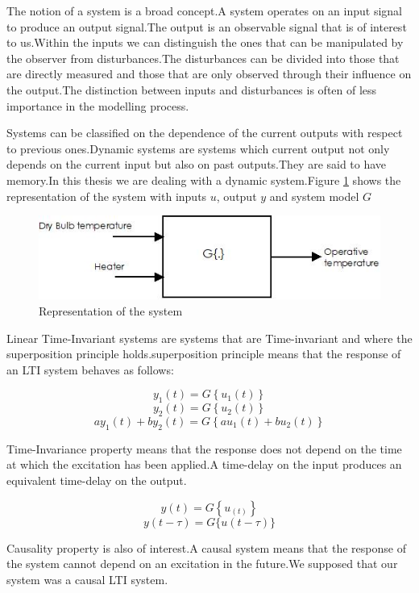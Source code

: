 \documentclass[a4paper,12pt]{article}
\numberwithin{equation}{section}
\begin{document}
The notion of a system is a broad concept.A system operates on an input signal to produce an output signal.The output is an observable signal that is of interest to us.Within the inputs we can distinguish the ones that can be manipulated by the observer from disturbances.The disturbances can be divided into those that are directly measured and those that are only observed through their influence on the output.The distinction between inputs and disturbances is often of less importance in the modelling process.

Systems can be classified on the dependence of the current outputs with respect to previous ones.Dynamic systems are systems which current output not only depends on the current input but also on past outputs.They are said to have memory.In this thesis we are dealing with a dynamic system.Figure \ref{fig:system representation} shows the representation of the system with inputs $u$, output $y$ and system model $G$

\begin{figure}[H]
    \includegraphics[scale=1]{system.jpeg}
    \centering
    \caption{Representation of the system}
    \label{fig:system representation}
\end{figure}


Linear Time-Invariant systems are systems that are Time-invariant and where the superposition principle holds.superposition principle means that the response of an LTI system behaves as follows:
    
\[y_{1}(t)=G\left\{u_{1}(t)\right\} \]
\[y_{2}(t)=G\left\{u_{2}(t)\right\} \]
\[a y_{1}(t)+b y_{2}(t)=G\left\{a u_{1}(t)+b u_{2}(t)\right\}\]

Time-Invariance property means that the response does not depend on the time at which the excitation has been applied.A time-delay on the input produces an equivalent
time-delay on the output.

\[y(t)=G\left\{u_(t)\right\} \]
\[y(t-\tau)=G\{u(t-\tau)\}\]

Causality property is also of interest.A causal system means that the response of the system cannot depend on an excitation in the future.We supposed that our system was a causal LTI system. 
\end{document}
